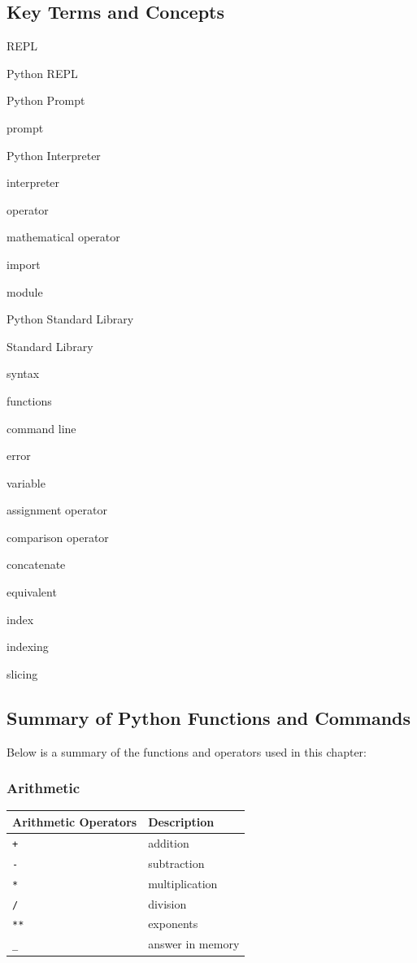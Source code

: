\documentclass{book}
\newenvironment{key_terms}{\begin{multicols}{3}}{\end{multicols}} %
\begin{document}
    
        \begin{key_terms}
        \subsection{Key Terms and Concepts}\label{key-terms-and-concepts}

REPL

Python REPL

Python Prompt

prompt

Python Interpreter

interpreter

operator

mathematical operator

import

module

Python Standard Library

Standard Library

syntax

functions

command line

error

variable

assignment operator

comparison operator

concatenate

equivalent

index

indexing

slicing
        \end{key_terms}

    




    
        \subsection{Summary of Python Functions and
Commands}\label{summary-of-python-functions-and-commands}

Below is a summary of the functions and operators used in this chapter:

\subsubsection{Arithmetic}\label{arithmetic}

\begin{longtable}[]{@{}ll@{}}
\toprule
Arithmetic Operators & Description\tabularnewline
\midrule
\endhead
\lstinline!+! & addition\tabularnewline
\lstinline!-! & subtraction\tabularnewline
\lstinline!*! & multiplication\tabularnewline
\lstinline!/! & division\tabularnewline
\lstinline!**! & exponents\tabularnewline
\lstinline!_! & answer in memory\tabularnewline
\bottomrule
\end{longtable}
\end{document}
